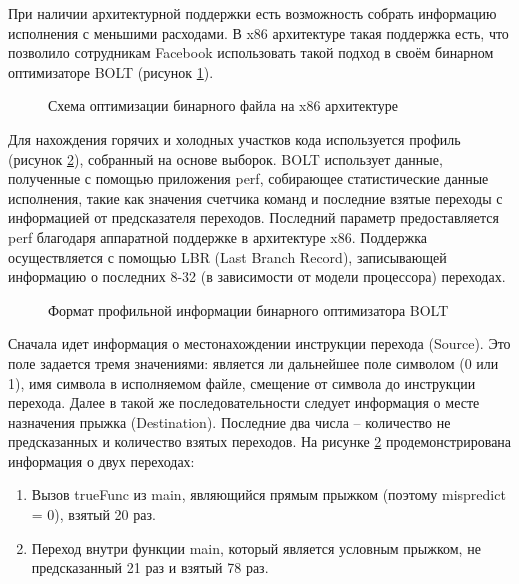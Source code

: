 При наличии архитектурной поддержки есть возможность собрать информацию исполнения с меньшими расходами. В x86 архитектуре такая поддержка есть, что позволило сотрудникам Facebook использовать такой подход в своём бинарном оптимизаторе BOLT (рисунок \cref{fig:OptX86})\cite{Panchenko2019}.

\begin{figure}[!h]
    \centerfloat{
        \texttt{[image: 2]}
    }
    \caption{Схема оптимизации бинарного файла на x86 архитектуре}\label{fig:OptX86}
\end{figure}

Для нахождения горячих и холодных участков кода используется профиль (рисунок \cref{fig:ProfileFormat}), собранный на основе выборок. BOLT использует данные, полученные с помощью приложения perf, собирающее статистические данные исполнения, такие как значения счетчика команд и последние взятые переходы с информацией от предсказателя переходов. Последний параметр предоставляется perf благодаря аппаратной поддержке в архитектуре x86. Поддержка осуществляется с помощью LBR (Last Branch Record), записывающей информацию о последних 8-32 (в зависимости от модели процессора) переходах.

\begin{figure}[!h]
    \caption{Формат профильной информации бинарного оптимизатора BOLT}\label{fig:ProfileFormat}
\end{figure}

Сначала идет информация о местонахождении инструкции перехода (Source). Это поле задается тремя значениями: является ли дальнейшее поле символом (0 или 1), имя символа в исполняемом файле, смещение от символа  до инструкции перехода. Далее в такой же последовательности следует информация о месте назначения прыжка (Destination). Последние два числа – количество не предсказанных и количество взятых переходов.
	На рисунке \cref{fig:ProfileFormat} продемонстрирована информация о двух переходах:
	
\begin{enumerate}[beginpenalty=10000]
  \item Вызов trueFunc из main, являющийся прямым прыжком (поэтому mispredict = 0), взятый 20 раз.
  \item Переход внутри функции main, который является условным прыжком, не предсказанный 21 раз и взятый 78 раз.
\end{enumerate}

